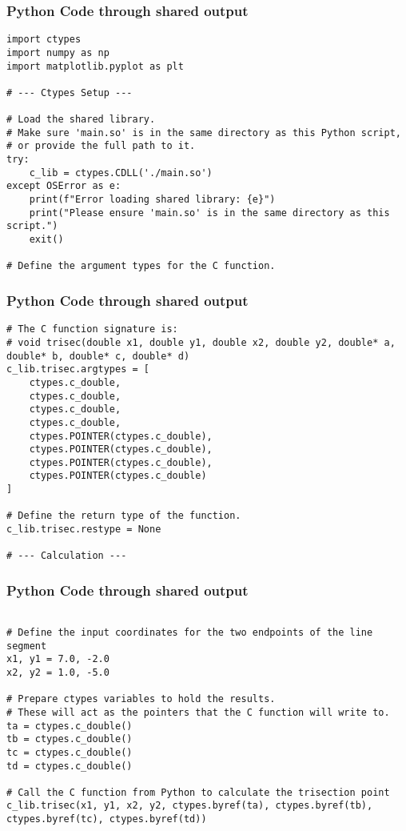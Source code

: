\documentclass{beamer}
\begin{document}
\begin{frame}[fragile]
\frametitle{Python Code through shared output}
\begin{lstlisting}
import ctypes
import numpy as np
import matplotlib.pyplot as plt

# --- Ctypes Setup ---

# Load the shared library. 
# Make sure 'main.so' is in the same directory as this Python script,
# or provide the full path to it.
try:
    c_lib = ctypes.CDLL('./main.so')
except OSError as e:
    print(f"Error loading shared library: {e}")
    print("Please ensure 'main.so' is in the same directory as this script.")
    exit()

# Define the argument types for the C function.
\end{lstlisting} 
\end{frame}
\begin{frame}[fragile]
\frametitle{Python Code through shared output}
\begin{lstlisting}
# The C function signature is:
# void trisec(double x1, double y1, double x2, double y2, double* a, double* b, double* c, double* d)
c_lib.trisec.argtypes = [
    ctypes.c_double, 
    ctypes.c_double, 
    ctypes.c_double, 
    ctypes.c_double, 
    ctypes.POINTER(ctypes.c_double), 
    ctypes.POINTER(ctypes.c_double),
    ctypes.POINTER(ctypes.c_double), 
    ctypes.POINTER(ctypes.c_double)
]

# Define the return type of the function.
c_lib.trisec.restype = None

# --- Calculation ---
\end{lstlisting} 
\end{frame}
\begin{frame}[fragile]
\frametitle{Python Code through shared output}
\begin{lstlisting}

# Define the input coordinates for the two endpoints of the line segment
x1, y1 = 7.0, -2.0
x2, y2 = 1.0, -5.0

# Prepare ctypes variables to hold the results.
# These will act as the pointers that the C function will write to.
ta = ctypes.c_double()
tb = ctypes.c_double()
tc = ctypes.c_double()
td = ctypes.c_double()

# Call the C function from Python to calculate the trisection point
c_lib.trisec(x1, y1, x2, y2, ctypes.byref(ta), ctypes.byref(tb), ctypes.byref(tc), ctypes.byref(td))

\end{lstlisting} 
\end{frame}
\end{document}
